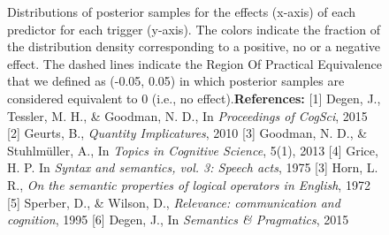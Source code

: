 \documentclass[11pt,letterpaper]{article}
\begin{document}
\begin{figure}   
    \caption{Distributions of posterior samples for the effects (x-axis) of each predictor for each trigger (y-axis). The colors indicate the fraction of the distribution density corresponding to a positive, no or a negative effect. The dashed lines indicate the Region Of Practical Equivalence that we defined as (-0.05, 0.05) in which posterior samples are considered equivalent to 0 (i.e., no effect).\newline \textbf{References:} [1] Degen, J., Tessler, M. H., \& Goodman, N. D., In \textit{Proceedings of CogSci}, 2015 [2] Geurts, B., \textit{Quantity Implicatures}, 2010 [3] Goodman, N. D., \& Stuhlm\"uller, A., In \textit{Topics in Cognitive Science}, 5(1), 2013 [4] Grice, H. P. In \textit{Syntax and semantics, vol. 3: Speech acts}, 1975 [3] Horn, L. R., \textit{On the semantic properties of logical operators in English}, 1972 [5] Sperber, D., \& Wilson, D., \textit{Relevance: communication and cognition}, 1995 [6] Degen, J., In \textit{Semantics \& Pragmatics}, 2015 
    }
    \label{posteriors}
\end{figure}


\newpage

\end{document}
